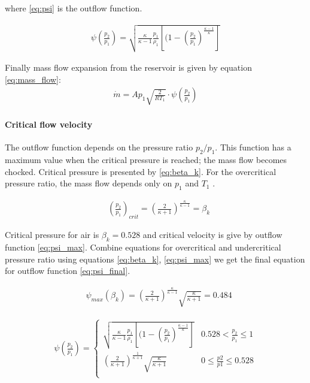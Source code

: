 where \ref{eq:psi} is the outflow function.

\begin{align}
    \psi\left(\frac{p_2}{p_1}\right) =  
    \sqrt{\frac{\kappa}{\kappa-1} \frac{p_1}{\rho_1} 
    \left[(1-\left(\frac{p_2}{p_1}\right)^\frac{\kappa-1}{\kappa}\right]}
    \label{eq:psi}
\end{align}

Finally mass flow expansion from the reservoir is given by equation
\ref{eq:mass_flow}:
\begin{align}
    \dot{m} = A p_1\sqrt{\frac{2}{RT_1}} \cdot \psi\left(\frac{p_2}{p_1}\right)
    \label{eq:mass_flow}
\end{align}


\paragraph{Critical flow velocity}
The outflow function depends on the pressure ratio $p_2/p_1$. This function
has a maximum value when the critical pressure is reached; the mass flow
becomes chocked. Critical pressure is presented by \ref{eq:beta_k}. For the
overcritical pressure ratio, the mass flow depends only on $p_1$ and $T_1$
\cite{isermann_mech}.

\begin{align}
    &\left(\frac{p_2}{p_1}\right)_{crit} =
    \left(\frac{2}{\kappa+1}\right)^\frac{\kappa}{\kappa-1}=\beta_k
    \label{eq:beta_k}
\end{align}

Critical pressure for air is $\beta_k = 0.528$ and critical velocity is
give by outflow function \ref{eq:psi_max}. Combine equations for
overcritical and undercritical pressure ratio using equations
\ref{eq:beta_k}, \ref{eq:psi_max} we get the final equation for outflow
function \ref{eq:psi_final}.

\begin{align}
    &\psi_{max} (\beta_k) = 
    \left(\frac{2}{\kappa+1}\right)^\frac{\kappa}{\kappa-1}\sqrt{\frac{\kappa}{\kappa+1}}
    = 0.484
    \label{eq:psi_max}
\end{align}

\begin{align}
\psi\left(\frac{p_2}{p_1}\right) = 
    \begin{cases}
    \sqrt{\frac{\kappa}{\kappa-1} \frac{p_1}{\rho_1} 
    \left[(1-\left(\frac{p_2}{p_1}\right)^\frac{\kappa-1}{\kappa}\right]}
    & 0.528 <\frac{p_2}{p_1} \le 1 \\
    \left(\frac{2}{\kappa +1}\right)^{\frac{1}{\kappa+1}}
    \sqrt{\frac{\kappa}{\kappa +1}} & 0 \le \frac{p2}{p1} \le 0.528\\
    \end{cases}
\label{eq:psi_final}
\end{align}

